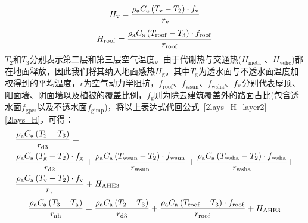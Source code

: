 %
\begin{equation}
  H_{\mathrm{v}} = \frac{\rho _{\rm a} C_{\mathrm a} \left( T_{\mathrm{v}} - T_{2} \right) \cdot f_{\rm v}}{r_{\mathrm{v}}}
\end{equation}
%
\begin{equation}\label{urban_Hroof}
  H_{\mathrm{roof}} = \frac{\rho _{\rm a} C_{\mathrm a} \left( T_{\mathrm{roof}} - T_{3} \right) \cdot f_{\mathrm{roof}}}{r_{\mathrm{roof}}}
\end{equation}
$T_2$和$T_3$分别表示第二层和第三层空气温度。由于代谢热与交通热($H_{\mathrm{meta}}$ 、$H_{\mathrm{vehc}}$)都在地面释放，因此我们将其纳入地面感热$H_{\mathrm{g}}$。其中$T_{\mathrm{g}}$为透水面与不透水面温度加权得到的平均温度，$r$为空气动力学阻抗，\allowbreak $f_{\mathrm{roof}}$、\allowbreak $f_{\mathrm{wsun}}$、\allowbreak $f_{\mathrm{wsha}}$、\allowbreak $f_{\rm v}$分别代表屋顶、阳面墙、阴面墙以及植被的覆盖比例，$f_{\mathrm{g}}$则为除去建筑覆盖外的路面占比(包含透水面$f_{\mathrm{gper}}$以及不透水面$f_{\mathrm{gimp}}$)，将以上表达式代回公式~\eqref{2lays_H_layer2}--\eqref{2lays_H}，可得：
\begin{equation}
  \begin{split}
    & \frac{\rho _{\rm a} C_{\mathrm a} \left( T_{2} - T_{3} \right)}{r_{\mathrm{d3}}} = \\
    & \frac{\rho _{\rm a} C_{\mathrm a} \left( T_{\mathrm{g}} - T_{2} \right) \cdot f_{\mathrm{g}}}{r_{\mathrm{d2}}} + \frac{\rho _{\rm a} C_{\mathrm a} \left( T_{\mathrm{wsun}} - T_{2} \right) \cdot f_{\mathrm{wsun}}}{r_{\mathrm{wsun}}} + \frac{\rho _{\rm a} C_{\mathrm a} \left( T_{\mathrm{wsha}} - T_{2} \right) \cdot f_{\mathrm{wsha}}}{r_{\mathrm{wsha}}} +
    \\
    & \frac{\rho _{\rm a} C_{\mathrm a} \left( T_{\mathrm{v}} - T_{2} \right) \cdot f_{\rm v}}{r_{\mathrm{v}}} + H_{\mathrm{AHE3}}
  \end{split}
\end{equation}
%
\begin{equation}
  \begin{split}
    \frac{\rho _{\rm a} C_{\mathrm a} \left( T_{3} - T_{\rm a} \right)}{r_{\mathrm{ah}}} =
    \frac{\rho _{\rm a} C_{\mathrm a} \left( T_{2} - T_{3} \right)}{r_{\mathrm{d3}}} + \frac{\rho _{\rm a} C_{\mathrm a} \left( T_{\mathrm{roof}} - T_{3} \right)\cdot f_{\mathrm{roof}}}{r_{\mathrm{roof}}} + H_{\mathrm{AHE3}}
  \end{split}
\end{equation}
